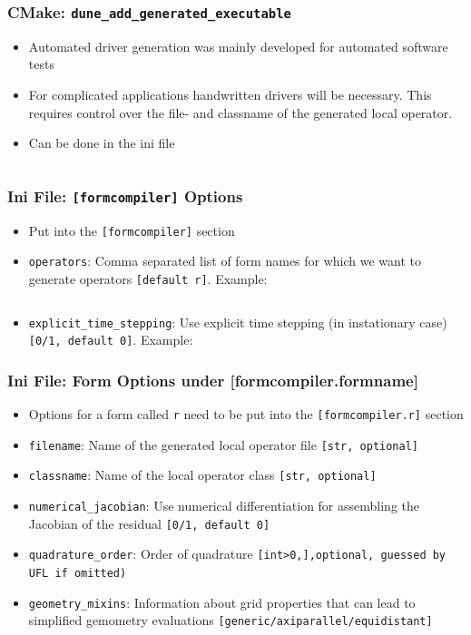 \documentclass[aspectratio=169,11pt]{beamer}
\theoremstyle{definition}
\begin{document}
\begin{frame}[fragile]
  \frametitle{CMake: \lstinline{dune_add_generated_executable}}

  \begin{itemize}
  \item Automated driver generation was mainly developed for automated software
    tests
  \item For complicated applications handwritten drivers will be
    necessary. This requires control over the file- and classname of the
    generated local operator.
  \item Can be done in the ini file \vspace{0.3cm}
    \inputminted[fontsize=\scriptsize]{ini}{classname_filename.ini}
  \end{itemize}
\end{frame}

\begin{frame}[fragile]
  \frametitle{Ini File: \lstinline{[formcompiler]} Options}

  \begin{itemize}
    \item Put into the \lstinline{[formcompiler]} section
  \item \lstinline{operators}: Comma separated list of form names for which we
    want to generate operators \lstinline{[default r]}. Example:
    \inputminted[fontsize=\small, firstline=12, lastline=13]{ini}{../src/heatequation.ini}

  \item \lstinline{explicit_time_stepping}: Use explicit time stepping (in
    instationary case) \lstinline{[0/1, default 0]}. Example:

  \end{itemize}
\end{frame}

\begin{frame}[fragile]
  \frametitle{Ini File: Form Options under [formcompiler.formname]}

  \begin{itemize}
  \item Options for a form called \lstinline{r} need to be put into the
    \lstinline{[formcompiler.r]} section
  \item \lstinline{filename}: Name of the generated local
    operator file \lstinline{[str, optional]}
  \item \lstinline{classname}: Name of the local operator class
    \lstinline{[str, optional]}
  \item \lstinline{numerical_jacobian}: Use numerical differentiation for
    assembling the Jacobian of the residual \lstinline{[0/1, default 0]}
  \item \lstinline{quadrature_order}: Order of quadrature \lstinline[language={}]{[int>0,],optional, guessed by UFL if omitted)}
  \item \lstinline{geometry_mixins}: Information about grid properties that can
    lead to simplified gemometry evaluations
    \lstinline{[generic/axiparallel/equidistant]}
  \end{itemize}
\end{frame}
\end{document}
